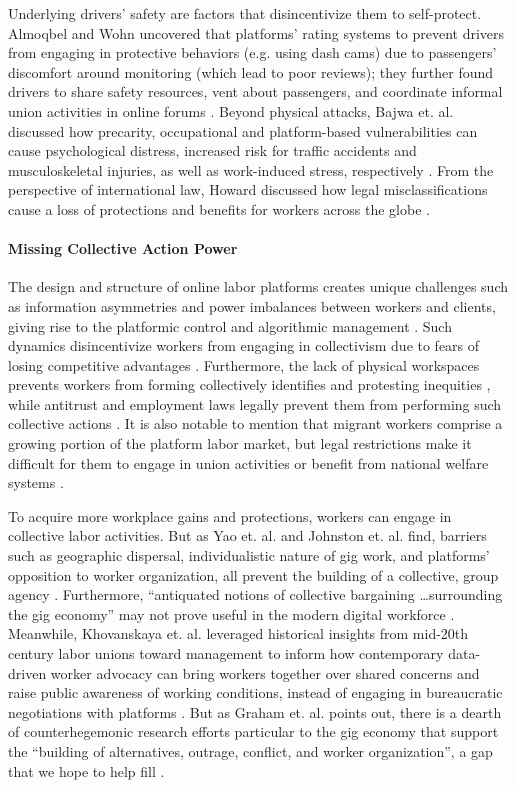 Underlying drivers' safety are factors that disincentivize them to self-protect. Almoqbel and Wohn uncovered that platforms' rating systems to prevent drivers from engaging in protective behaviors (e.g. using dash cams) due to passengers' discomfort around monitoring (which lead to poor reviews); they further found drivers to share safety resources, vent about passengers, and coordinate informal union activities in online forums \cite{jbho}. Beyond physical attacks, Bajwa et. al. discussed how precarity, occupational and platform-based vulnerabilities can cause psychological distress, increased risk for traffic accidents and musculoskeletal injuries, as well as work-induced stress, respectively \cite{rc6G}. From the  perspective of international law, Howard discussed how legal misclassifications cause a loss of protections and benefits for workers across the globe \cite{Howard2017-wd}.


\paragraph{Missing Collective Action Power}
The design and structure of online labor platforms creates unique challenges such as information asymmetries and power imbalances between workers and clients, giving rise to the platformic control and algorithmic management \cite{power_struggles,Jarrahi2019-if, precarity, platform_manage,gray2019ghost, power, algorithmic}. 
Such dynamics disincentivize workers from engaging in collectivism due to fears of losing competitive advantages \cite{atom}. Furthermore, the lack of physical workspaces prevents workers from forming collectively identifies and protesting inequities \cite{chesta2019labour, end}, while antitrust and employment laws legally prevent them from performing such collective actions \cite{paNg, paul2019fissuring}. It is also notable to mention that migrant workers comprise a growing portion of the platform labor market, but legal restrictions make it difficult for them to engage in union activities or benefit from national welfare systems \cite{van2020migration}.

To acquire more workplace gains and protections, workers can engage in collective labor activities. But as Yao et. al. and Johnston et. al. find, barriers such as geographic dispersal, individualistic nature of gig work, and platforms' opposition to worker organization, all prevent the building of a collective, group agency \cite{atom, organizing}. Furthermore, ``antiquated notions of collective bargaining \dots surrounding the gig economy'' may not prove useful in the modern digital workforce \cite{organizing}. Meanwhile, Khovanskaya et. al. leveraged historical insights from mid-20th century labor unions toward management to inform how contemporary data-driven worker advocacy can bring workers together over shared concerns and raise public awareness of working conditions, instead of engaging in bureaucratic negotiations with platforms \cite{khovanskaya2019tools}. But as Graham et. al. points out, there is a dearth of counterhegemonic research efforts particular to the gig economy that support the ``building of alternatives, outrage, conflict, and worker organization'', a gap that we hope to help fill \cite{graham2018towards, outsidetheboss}.

